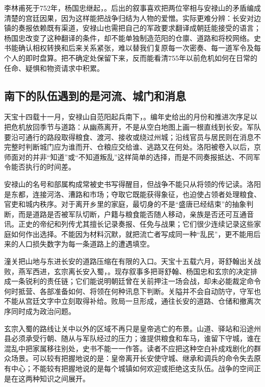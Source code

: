 李林甫死于752年，杨国忠继起，。后出的叙事喜欢把两位宰相与安禄山的矛盾编成清楚的宫廷因果，因为这样能把战争归结为人物的爱憎。实际更难分辨：长安对边镇的奏报依赖既有渠道，安禄山也需把自己的军政要求翻译成朝廷能接受的语言；杨国忠改变了这种翻译的条件，却不能单独制造范阳的仓廪、道路和将校网络。史书能确认相权转换和后来关系紧张，难以替我们复原每一次密奏、每一道军令及每个人的即时盘算。把不确定处保留下来，反而能看清755年以前危机如何在日常的任命、疑惧和物资请求中积累。

\subsection{南下的队伍遇到的是河流、城门和消息}
天宝十四载十一月，安禄山自范阳起兵南下，。编年史给出的月份和推进次序足以把危机放回季节与道路：从幽燕离开，不是从空白地图上画一根直线到长安。军队要沿可通行的路段取得粮食、渡河、接收或绕过州城；沿线官员与居民则在消息不完整时判断城门应为谁而开、仓粮应交给谁、逃路又在何处。洛阳被卷入以后，京师面对的并非“知道”或“不知道叛乱”这样简单的选择，而是不同奏报抵达、不同军令能否执行的时间差。

安禄山的名号和部属构成常被史书写得醒目，但战争不能只从将领的传记读。洛阳是东都，连接河洛、漕路和市场；夺取它既能获得象征，也迫使占领者处理粮食、官吏和城内秩序。对于离开乡里的家庭，最切身的不是“盛唐已经结束”的抽象判断，而是道路是否被军队切断，户籍与粮食能否随人移动，亲族是否还可互通音讯。正史的帝纪和列传尤其擅长记录奏报、任免与战果；它们很少连续记录这些家庭如何作出选择。不能因为材料沉默，就把流亡者写成同一种“乱民”，更不能用后来的人口损失数字为每一条道路上的遭遇填空。

潼关把山地与东进长安的道路压缩在有限的入口。天宝十五载六月，哥舒翰出关战败，燕军西进，玄宗离长安入蜀，。现存叙事多把哥舒翰、杨国忠和玄宗的决定排成一条锐利的责任链；它们能说明朝廷曾在关前押注一场会战，却未必能裁定命令何时抵营、各部准备如何、将领在何种讯息下判断。关隘并不会自动防守，守军也不能从宫廷文字中立刻取得补给。败局一旦形成，通往长安的道路、仓储和撤离次序同时成为政治问题。

玄宗入蜀的路线让关中以外的区域不再只是皇帝逃亡的布景。山道、驿站和沿途州县必须承受行朝、随从与军队经过的压力；谁提供粮食和车马，谁留下守城，谁在混乱中把家属移往别处，史书不能一一作答。读者不应把这种空白补成戏剧化的群众场景。可以较有把握地说的是：皇帝离开长安使守城、继承和调兵的命令失去原有中心；不能较有把握地说的是每个城镇如何欢迎或拒绝这支队伍。战争的空间正是在这两种知识之间展开。

